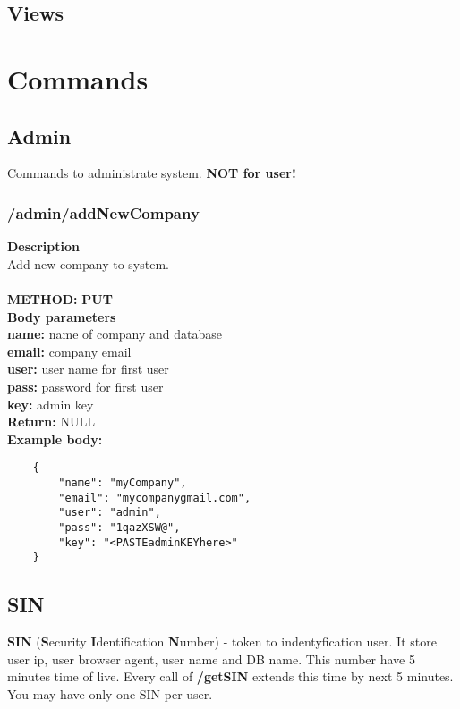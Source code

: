 \documentclass[a4paper, 12pt]{report}
\begin{document}
\section{Views}
\chapter{Commands}
\section{Admin}
Commands to administrate system. \textbf{NOT for user!}

\subsection{/admin/addNewCompany}


\textbf{\color{redText} Description} \\
Add new company to system. \\ \\
\textbf{\color{redText} METHOD: } \textbf{PUT} \\
\textbf{\color{redText} Body parameters} \\
\textbf{name: } name of company and database \\
\textbf{email: } company email \\
\textbf{user: } user name for first user \\
\textbf{pass: } password for first user \\
\textbf{key: } admin key \\
\textbf{\color{redText} Return: } NULL \\
\textbf{\color{redText} Example body: }
\begin{lstlisting}
    {
        "name": "myCompany",
        "email": "mycompanygmail.com",
        "user": "admin",
        "pass": "1qazXSW@",
        "key": "<PASTEadminKEYhere>"
    }
\end{lstlisting}

\section{SIN}
\textbf{SIN} (\textbf{S}ecurity \textbf{I}dentification \textbf{N}umber) - token to indentyfication user. It store user ip, user browser agent, user name and DB name.
This number have 5 minutes time of live. Every call of \textbf{/getSIN} extends this time by next 5 minutes.
You may have only one SIN per user.
\end{document}
